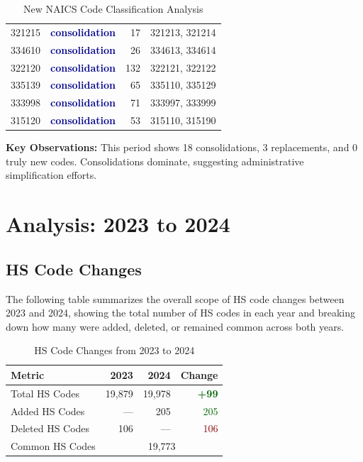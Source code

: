 \documentclass[11pt]{article}
\newcommand{\increase}[1]{\textcolor{darkgreen}{\textbf{+#1}}}
\begin{document}
\begin{table}[H]
\begin{tabular}{llrl}
321215 & \textcolor{darkblue}{\textbf{consolidation}} & 17 & 321213, 321214 \\
334610 & \textcolor{darkblue}{\textbf{consolidation}} & 26 & 334613, 334614 \\
322120 & \textcolor{darkblue}{\textbf{consolidation}} & 132 & 322121, 322122 \\
335139 & \textcolor{darkblue}{\textbf{consolidation}} & 65 & 335110, 335129 \\
333998 & \textcolor{darkblue}{\textbf{consolidation}} & 71 & 333997, 333999 \\
315120 & \textcolor{darkblue}{\textbf{consolidation}} & 53 & 315110, 315190 \\
\bottomrule
\end{tabular}
\caption{New NAICS Code Classification Analysis}
\end{table}

\textbf{Key Observations:} This period shows 18 consolidations, 3 replacements, and 0 truly new codes. Consolidations dominate, suggesting administrative simplification efforts.

\newpage


\section{Analysis: 2023 to 2024}

\subsection{HS Code Changes}

The following table summarizes the overall scope of HS code changes between 2023 and 2024, showing the total number of HS codes in each year and breaking down how many were added, deleted, or remained common across both years.

\begin{table}[H]
\centering
{}
\begin{tabular}{lrrr}
\toprule
\textbf{Metric} & \textbf{2023} & \textbf{2024} & \textbf{Change} \\
\midrule
Total HS Codes & 19,879 & 19,978 & \increase{99} \\
Added HS Codes & --- & 205 & \textcolor{darkgreen}{205} \\
Deleted HS Codes & 106 & --- & \textcolor{darkred}{106} \\
Common HS Codes & \multicolumn{3}{c}{19,773} \\
\bottomrule
\end{tabular}
\caption{HS Code Changes from 2023 to 2024}
\end{table}
\end{document}
